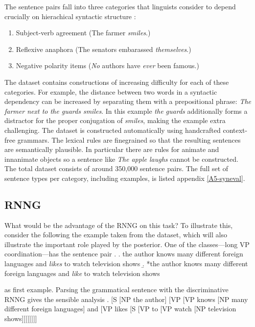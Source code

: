     The sentence pairs fall into three categories that linguists consider to depend crucially on hierachical syntactic structure \citep{everaert2015structures,xiang2009illusory}:
      \begin{enumerate}[noitemsep]
        \item Subject-verb agreement (The farmer \textit{smiles}.)
        \item Reflexive anaphora (The senators embarassed \textit{themselves}.)
        \item Negative polarity items (\textit{No} authors have \textit{ever} been famous.)
      \end{enumerate}
    The dataset contains constructions of increasing difficulty for each of these categories. For example, the distance between two words in a syntactic dependency can be increased by separating them with a prepositional phrase: \textit{The farmer next to the guards smiles}. In this example \textit{the guards} additionally forms a distractor for the proper conjugation of \textit{smiles}, making the example extra challenging. The dataset is constructed automatically using handcrafted context-free grammars. The lexical rules are finegrained so that the resulting sentences are semantically plausible. In particular there are rules for animate and innanimate objects so a sentence like \textit{The apple laughs} cannot be constructed. The total dataset consists of around 350,000 sentence pairs. The full set of sentence types per category, including examples, is listed appendix \ref{A5-syneval}.

  \subsection{RNNG}
    What would be the advantage of the RNNG on this task? To illustrate this, consider the following the example taken from the dataset, which will also illustrate the important role played by the posterior. One of the classes---long VP coordination---has the sentence pair
    \exi. \a. the author knows many different foreign languages and \textit{likes} to watch television shows
      \b. *the author knows many different foreign languages and \textit{like} to watch television shows

    as first example. Parsing the grammatical sentence with the discriminative RNNG gives the sensible analysis
    \exi. [S [NP the author] [VP [VP knows [NP many different foreign languages] and [VP likes [S [VP to [VP watch [NP television shows]]]]]]]]

